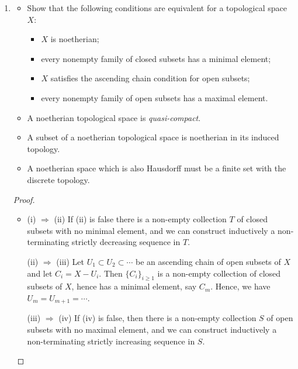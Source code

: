 \documentclass[a4paper]{article}
\begin{document}
\begin{enumerate} [label=\textbf{\arabic*.}, leftmargin=0em]
    \item[\textbf{7.}]
          \begin{itemize}
              \item[(a)] Show that the following conditions are equivalent for a topological space $X$:
                    \begin{itemize}
                        \item[(i)] $X$ is noetherian;
                        \item[(ii)] every nonempty family of closed subsets has a minimal element;
                        \item[(iii)] $X$ satisfies the ascending chain condition for open subsets;
                        \item[(vi)] every nonempty family of open subsets has a maximal element.
                    \end{itemize}

              \item[(b)] A noetherian topological space is \textit{quasi-compact}.

              \item[(c)] A subset of a noetherian topological space is noetherian in its induced topology.

              \item[(d)] A noetherian space which is also Hausdorff must be a finite set with the discrete topology.
          \end{itemize}

          \begin{proof} $ $ \vspace{0pt}
              \begin{itemize} [leftmargin=0cm]
                  \item[(a)] (i) $\Rightarrow$ (ii) If (ii) is false there is a non-empty collection $T$ of closed subsets with no minimal element, and we can construct inductively a non-terminating strictly decreasing sequence in $T$.

                        (ii) $\Rightarrow$ (iii) Let $U_1 \subset U_2 \subset \cdots$ be an ascending chain of open subsets of $X$ and let $C_i = X - U_i$. Then $\{ C_i \}_{i \geq 1}$ is a non-empty collection of closed subsets of $X$, hence has a minimal element, say $C_m$. Hence, we have $U_m = U_{m + 1} = \cdots$.

                        (iii) $\Rightarrow$ (iv) If (iv) is false, then there is a non-empty collection $S$ of open subsets with no maximal element, and we can construct inductively a non-terminating strictly increasing sequence in $S$.


\end{itemize}
\end{proof}
\end{enumerate}
\end{document}
